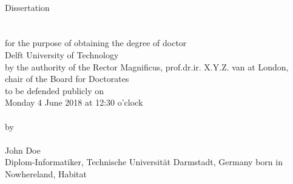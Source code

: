 \begin{titlepage}

\begin{center}
\printtitle \\ ~\\~\\~\\~\\~\\%
Dissertation \\ ~\\~\\
for the purpose of obtaining the degree of doctor \\
Delft University of Technology  \\
by the authority of the Rector Magnificus, prof.dr.ir. X.Y.Z. van at London,\\%
chair of the Board for Doctorates\\
to be defended publicly on\\
Monday 4 June 2018 at 12:30 o’clock \\~\\ %
by\\~\\
John Doe\\ %
Diplom-Informatiker, Technische Universität Darmstadt, Germany%
born in Nowhereland, Habitat %
\end{center}
\vfill
\end{titlepage}


